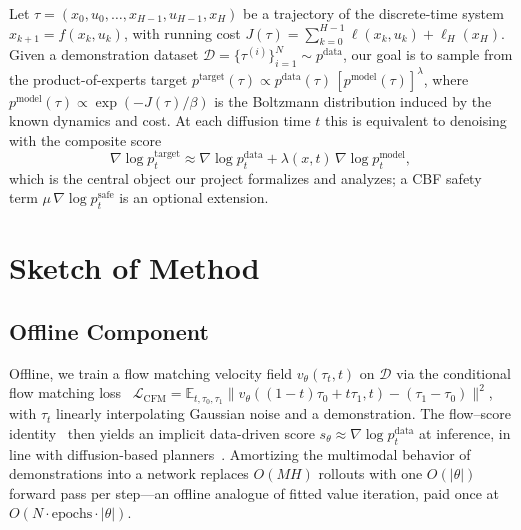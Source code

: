 \documentclass[conference]{IEEEtran}
\begin{document}
Let $\tau=(x_0,u_0,\ldots,x_{H-1},u_{H-1},x_H)$ be a trajectory of
the discrete-time system $x_{k+1}=f(x_k,u_k)$, with running cost
$J(\tau)=\sum_{k=0}^{H-1}\ell(x_k,u_k)+\ell_H(x_H)$. Given a
demonstration dataset
$\mathcal{D}=\{\tau^{(i)}\}_{i=1}^{N}\!\sim\!p^{\mathrm{data}}$, our
goal is to sample from the product-of-experts target
$p^{\mathrm{target}}(\tau)\propto p^{\mathrm{data}}(\tau)\,
[p^{\mathrm{model}}(\tau)]^{\lambda}$, where
$p^{\mathrm{model}}(\tau)\propto\exp(-J(\tau)/\beta)$ is the
Boltzmann distribution induced by the known dynamics and cost. At
each diffusion time $t$ this is equivalent to denoising with the
composite score
\begin{equation}
  \nabla\log p^{\mathrm{target}}_t \approx
  \nabla\log p^{\mathrm{data}}_t
  + \lambda(x,t)\,\nabla\log p^{\mathrm{model}}_t,
  \label{eq:score}
\end{equation}
which is the central object our project formalizes and analyzes; a
CBF safety term $\mu\,\nabla\log p^{\mathrm{safe}}_t$ is an optional
extension.

\section{Sketch of Method}

\subsection{Offline Component}


Offline, we train a flow matching velocity field $v_\theta(\tau_t,t)$
on $\mathcal{D}$ via the conditional flow matching
loss~\cite{lipman2023flow}
$\mathcal{L}_{\mathrm{CFM}}=\mathbb{E}_{t,\tau_0,\tau_1}\|
v_\theta((1-t)\tau_0+t\tau_1,t)-(\tau_1-\tau_0)\|^2$, with $\tau_t$
linearly interpolating Gaussian noise and a demonstration. The
flow--score identity~\cite{song2021score} then yields an implicit
data-driven score
$s_\theta\!\approx\!\nabla\log p^{\mathrm{data}}_t$ at inference, in
line with diffusion-based planners~\cite{flowmp,janner2022}.
Amortizing the multimodal behavior of demonstrations into a network
replaces $O(MH)$ rollouts with one $O(|\theta|)$ forward pass per
step---an offline analogue of fitted value iteration, paid once at
$O(N\!\cdot\!\text{epochs}\!\cdot\!|\theta|)$.
\end{document}
